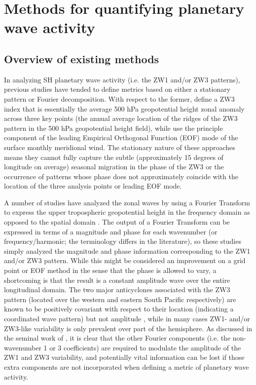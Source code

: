 \section{Methods for quantifying planetary wave activity}\label{s:methodology}

\subsection{Overview of existing methods}\label{s:existing_metrics}

In analyzing SH planetary wave activity (i.e. the ZW1 and/or ZW3 patterns), previous studies have tended to define metrics based on either a stationary pattern or Fourier decomposition. With respect to the former, \citet{Raphael2004} define a ZW3 index that is essentially the average 500 hPa geopotential height zonal anomaly across three key points (the annual average location of the ridges of the ZW3 pattern in the 500 hPa geopotential height field), while \citet{Yuan2008} use the principle component of the leading Empirical Orthogonal Function (EOF) mode of the surface monthly meridional wind. The stationary nature of these approaches means they cannot fully capture the subtle (approximately 15 degrees of longitude on average) seasonal migration in the phase of the ZW3 \citep{vanLoon1984,Mo1985} or the occurrence of patterns whose phase does not approximately coincide with the location of the three analysis points or leading EOF mode.

A number of studies have analyzed the zonal waves by using a Fourier Transform to express the upper tropospheric geopotential height in the frequency domain as opposed to the spatial domain \citep{Hobbs2007,Hobbs2010,Turner2013}. The output of a Fourier Transform can be expressed in terms of a magnitude and phase for each wavenumber (or frequency/harmonic; the terminology differs in the literature), so these studies simply analyzed the magnitude and phase information corresponding to the ZW1 and/or ZW3 pattern. While this might be considered an improvement on a grid point or EOF method in the sense that the phase is allowed to vary, a shortcoming is that the result is a constant amplitude wave over the entire longitudinal domain. The two major anticyclones associated with the ZW3 pattern (located over the western and eastern South Pacific respectively) are known to be positively covariant with respect to their location (indicating a coordinated wave pattern) but not amplitude \citep{Hobbs2010}, while in many cases ZW1- and/or ZW3-like variability is only prevalent over part of the hemisphere. As discussed in the seminal work of \citet{vanLoon1972}, it is clear that the other Fourier components (i.e. the non-wavenumber 1 or 3 coefficients) are required to modulate the amplitude of the ZW1 and ZW3 variability, and potentially vital information can be lost if those extra components are not incorporated when defining a metric of planetary wave activity. 

